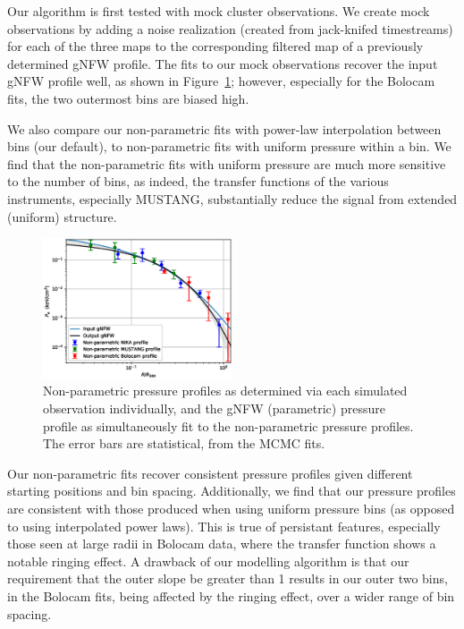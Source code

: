 \documentclass[twocolumn,traditabstract]{aa}
\begin{document}
Our algorithm is first tested with mock cluster observations. We create mock observations by adding
a noise realization (created from jack-knifed timestreams) for each of the three maps to the
corresponding filtered map of a previously determined \citep{romero2016} gNFW profile. The fits to
our mock observations recover the input gNFW profile well, as shown in Figure~\ref{fig:virt_robustness};
however, especially for the Bolocam fits, the two outermost bins are biased high.

We also compare our non-parametric fits with power-law interpolation between bins (our default),
to non-parametric fits with uniform pressure within a bin. We find that the non-parametric fits with uniform
pressure are much more sensitive to the number of bins, as indeed, the transfer functions of the various
instruments, especially MUSTANG, substantially reduce the signal from extended (uniform) structure.

\begin{figure}[!h]
  \centering
  \includegraphics[width=0.5\textwidth]{NIKA_ml_deproj_figs/Virt_Joint_gNFW_Power_Virt_11011111_2500S_500B_100W_gNFW_pressure_w_NP_pts_p16cosmo_input_vs_output_v2.eps}
  \caption{Non-parametric pressure profiles as determined via each simulated observation individually,
    and the gNFW (parametric) pressure profile as simultaneously fit to the non-parametric pressure profiles.
    The error bars are statistical, from the MCMC fits.}
  \label{fig:virt_robustness}
\end{figure}

Our non-parametric fits recover consistent pressure profiles given different starting positions and bin spacing.
Additionally, we find that our pressure profiles are consistent with those produced when using uniform pressure
bins (as opposed to using interpolated power laws). This is true of persistant features, especially those seen
at large radii in Bolocam data, where the transfer function shows a notable ringing effect. A drawback of our
modelling algorithm is that our requirement that the outer slope be greater than 1 results in our outer two bins,
in the Bolocam fits, being affected by the ringing effect, over a wider range of bin spacing. 
\end{document}
